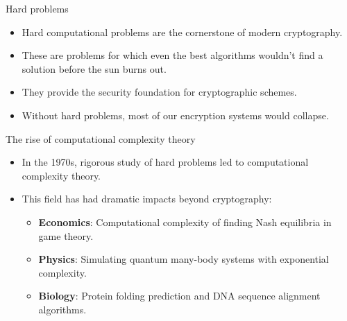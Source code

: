 \documentclass[aspectratio=169, lualatex, handout]{beamer}
\begin{document}
\begin{frame}{Hard problems}
	\begin{itemize}[<+->]
		\item Hard computational problems are the cornerstone of modern cryptography.
		\item These are problems for which even the best algorithms wouldn't find a solution before the sun burns out.
		\item They provide the security foundation for cryptographic schemes.
		\item Without hard problems, most of our encryption systems would collapse.
	\end{itemize}
\end{frame}

\begin{frame}{The rise of computational complexity theory}
	\begin{itemize}
		\item In the 1970s, rigorous study of hard problems led to computational complexity theory.
		\item This field has had dramatic impacts beyond cryptography:
		      \begin{itemize}
			      \item \textbf{Economics}: Computational complexity of finding Nash equilibria in game theory.
			      \item \textbf{Physics}: Simulating quantum many-body systems with exponential complexity.
			      \item \textbf{Biology}: Protein folding prediction and DNA sequence alignment algorithms.
		      \end{itemize}
	\end{itemize}
\end{frame}
\end{document}
